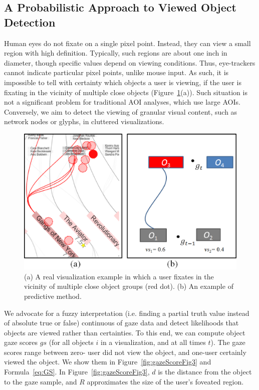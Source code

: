 \subsection{A Probabilistic Approach to Viewed Object Detection}
\label{sec:ProbabilisticObjectDetection}

Human eyes do not fixate on a single pixel point. Instead, they can view a small region with high definition. Typically, such regions are about one inch in diameter, though specific values depend on viewing conditions. Thus, eye-trackers cannot indicate particular pixel points, unlike mouse input. As such, it is impossible to tell with certainty which objects a user is viewing, if the user is fixating in the vicinity of multiple close objects (Figure~\ref{fig:discreminateFig4}(a)). Such situation is not a significant problem for traditional AOI analyses, which use large AOIs. Conversely, we aim to detect the viewing of granular visual content, such as network nodes or glyphs, in cluttered visualizations.

\begin{figure}[htb]
  \centering
  \includegraphics[width=\linewidth]{images/discreminateFig4.eps}
  \caption{(a) A real visualization example in which a user fixates in the vicinity of multiple close object groups (red dot). (b) An example of predictive method.}
	\label{fig:discreminateFig4}
\end{figure}

We advocate for a fuzzy interpretation (i.e. finding a partial truth value instead of absolute true or false) continuous of gaze data and detect likelihoods that objects are viewed rather than certainties. To this end, we can compute object gaze scores $gs$ (for all objects $i$ in a visualization, and at all times $t$). The gaze scores range between zero- user did not view the object, and one-user certainly viewed the object. We show them in Figure~\ref{fig:gazeScoreFig3} and Formula~\ref{eq:GS}. In Figure~\ref{fig:gazeScoreFig3}, $d$ is the distance from the object to the gaze sample, and $R$ approximates the size of the user's foveated region.

